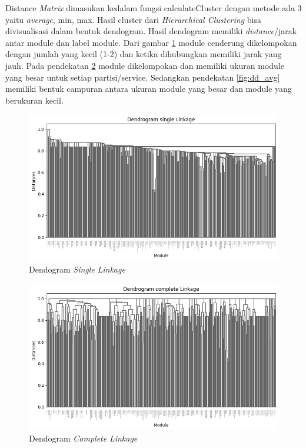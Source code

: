 Distance \textit{Matrix} dimasukan kedalam fungsi calculateCluster dengan metode ada 3 yaitu \textit{average}, min, max. Hasil cluster dari \textit{Hierarchical Clustering} bisa divisualisasi dalam bentuk dendogram. Hasil dendogram memiliki \textit{distance}/jarak antar module dan label module. Dari gambar \ref{fig:dd_single} module cenderung dikelompokan dengan jumlah yang kecil (1-2) dan ketika dihubungkan memiliki jarak yang jauh. Pada pendekatan \ref{fig:dd_complete} module dikelompokan dan memiliki ukuran module yang besar untuk setiap partisi/service. Sedangkan pendekatan \ref{fig:dd_avg} memiliki bentuk campuran antara ukuran module yang besar dan module yang berukuran kecil.

\begin{figure}[htbp]
	\centering
	\begin{minipage}{1\textwidth}
		\centering
		\includegraphics[width=1\textwidth]{img/bab_4/single_dd.png}
		\caption{Dendogram \textit{Single} \textit{Linkage} }
		\label{fig:dd_single}
	\end{minipage}\hfill	
\end{figure}

\begin{figure}[htbp]
	\centering
	\begin{minipage}{1\textwidth}
		\centering
		\includegraphics[width=1\textwidth]{img/bab_4/complete_dd.png}
		\caption{Dendogram \textit{Complete} \textit{Linkage} }
		\label{fig:dd_complete}
	\end{minipage}\hfill	
\end{figure}

